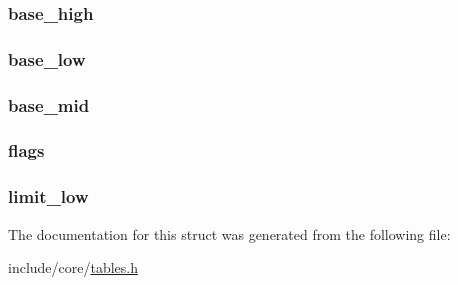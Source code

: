 \subsubsection[{\texorpdfstring{base\+\_\+high}{base_high}}]{ base\+\_\+high}\hypertarget{structgdt__entry__struct_a706c81b840522a69ab6e6e941630d5e4}{}\label{structgdt__entry__struct_a706c81b840522a69ab6e6e941630d5e4}
\subsubsection[{\texorpdfstring{base\+\_\+low}{base_low}}]{ base\+\_\+low}\hypertarget{structgdt__entry__struct_a0a776dced2c26f16298425cde39f8364}{}\label{structgdt__entry__struct_a0a776dced2c26f16298425cde39f8364}
\subsubsection[{\texorpdfstring{base\+\_\+mid}{base_mid}}]{ base\+\_\+mid}\hypertarget{structgdt__entry__struct_a35c709a004babd09046db9f667ba0646}{}\label{structgdt__entry__struct_a35c709a004babd09046db9f667ba0646}
\subsubsection[{\texorpdfstring{flags}{flags}}]{ flags}\hypertarget{structgdt__entry__struct_a138dda98fcd4738346af61bcca8cf4b4}{}\label{structgdt__entry__struct_a138dda98fcd4738346af61bcca8cf4b4}
\subsubsection[{\texorpdfstring{limit\+\_\+low}{limit_low}}]{ limit\+\_\+low}\hypertarget{structgdt__entry__struct_af9013229edfb91d4820f66b8df890ce3}{}\label{structgdt__entry__struct_af9013229edfb91d4820f66b8df890ce3}


The documentation for this struct was generated from the following file\+:\begin{DoxyCompactItemize}
\item 
include/core/\hyperlink{tables_8h}{tables.\+h}\end{DoxyCompactItemize}
